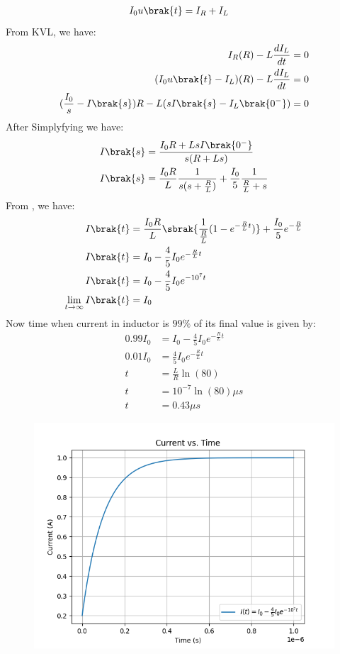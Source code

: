 \documentclass[journal,12pt,twocolumn]{IEEEtran}
\theoremstyle{remark}
\begin{document}
\begin{align}
    I_0u\brak{t} &= I_R + I_L
\end{align}
From KVL, we have:
\begin{align}
    I_R(R) - L\frac{dI_L}{dt} &= 0\\
    (I_0u\brak{t} - I_L)(R) - L\frac{dI_L}{dt} &=0\\
    (\frac{I_0}{s} -I\brak{s})R - L(sI\brak{s} - I_L\brak{0^-}) &=0
\end{align}
After Simplyfying we have:
\begin{align}
    I\brak{s} &= \frac{ I_0R +LsI\brak{0^-}}{s(R+Ls)}\\
    I\brak{s} &= \frac{I_0R}{L}\frac{1}{s(s+\frac{R}{L})} + \frac{I_0}{5}\frac{1}{\frac{R}{L}+s}
\end{align}
From , we have:
\begin{align}
    I\brak{t} & = \frac{I_0R}{L} \sbrak{\frac{1}{\frac{R}{L}}(1-e^{-\frac{R}{L}t})} + \frac{I_0}{5}e^{-\frac{R}{L}}\\
    I\brak{t} &= I_0 -\frac{4}{5}I_0e^{-\frac{R}{L}t}\\
    I\brak{t} &= I_0 -\frac{4}{5}I_0e^{-10^{7}t}\\
    \lim_{t \to \infty} I\brak{t} &= I_0
\end{align}
Now time when current in inductor is $99\%$ of its final value is given by:
\begin{align}
    0.99I_0 &= I_0 -\frac{4}{5}I_0e^{-\frac{R}{L}t}\\
    0.01I_0 &= \frac{4}{5}I_0e^{-\frac{R}{L}t}\\
    t &= \frac{L}{R}\ln(80)\\
    t &= 10^{-7}\ln(80) \mu s\\
    t &= 0.43 \mu s
\end{align}
\begin{figure}[ht!]
	\includegraphics[width=\columnwidth]{plots/Figure_1.png}
\end{figure}

  
\end{document}
